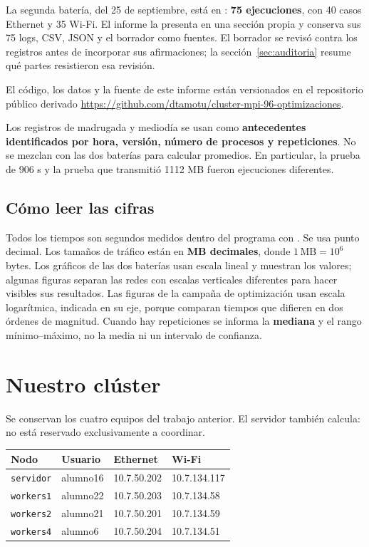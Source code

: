 La segunda batería, del 25 de septiembre, está en : \textbf{75 ejecuciones}, con 40 casos Ethernet y 35 Wi-Fi. El informe la presenta en una sección propia y conserva sus 75 logs, CSV, JSON y el borrador  como fuentes. El borrador se revisó contra los registros antes de incorporar sus afirmaciones; la sección~\ref{sec:auditoria} resume qué partes resistieron esa revisión.

El código, los datos y la fuente de este informe están versionados en el repositorio público derivado \url{https://github.com/dtamotu/cluster-mpi-96-optimizaciones}.

Los registros de madrugada y mediodía se usan como \textbf{antecedentes identificados por hora, versión, número de procesos y repeticiones}. No se mezclan con las dos baterías para calcular promedios. En particular, la prueba de 906 s y la prueba que transmitió 1112 MB fueron ejecuciones diferentes.

\subsection{Cómo leer las cifras}
Todos los tiempos son segundos medidos dentro del programa con . Se usa punto decimal. Los tamaños de tráfico están en \textbf{MB decimales}, donde $1\,\mathrm{MB}=10^6$ bytes. Los gráficos de las dos baterías usan escala lineal y muestran los valores; algunas figuras separan las redes con escalas verticales diferentes para hacer visibles sus resultados. Las figuras de la campaña de optimización usan escala logarítmica, indicada en su eje, porque comparan tiempos que difieren en dos órdenes de magnitud. Cuando hay repeticiones se informa la \textbf{mediana} y el rango mínimo--máximo, no la media ni un intervalo de confianza.

\section{Nuestro clúster}

Se conservan los cuatro equipos del trabajo anterior. El servidor también calcula: no está reservado exclusivamente a coordinar.

\begin{center}\small
\begin{tabular}{llll}
\toprule
Nodo & Usuario & Ethernet & Wi-Fi \\
\midrule
\texttt{servidor} & alumno16 & 10.7.50.202 & 10.7.134.117 \\
\texttt{workers1} & alumno22 & 10.7.50.203 & 10.7.134.58 \\
\texttt{workers2} & alumno21 & 10.7.50.201 & 10.7.134.59 \\
\texttt{workers4} & alumno6 & 10.7.50.204 & 10.7.134.51 \\
\bottomrule
\end{tabular}\end{center}

